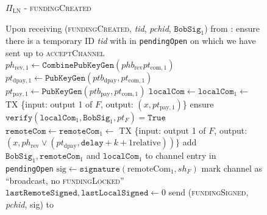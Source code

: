 \begin{figure}[!htbp]
  \begin{protocolbox}{$\Pi_{\mathrm{LN}}$ - \textsc{fundingCreated}}
    \begin{algorithmic}[1]
      \State Upon receiving (\textsc{fundingCreated}, \textit{tid},
      \textit{pchid}, $\mathtt{BobSig}_1$) from \bob:
      \Indent
        \State ensure there is a temporary ID \textit{tid} with \bob{} in
        \texttt{pendingOpen} on which we have sent up to \textsc{acceptChannel}
        \State $ph_{\mathrm{rev}, 1} \gets
        \mathtt{CombinePubKeyGen}\left(phb_{\mathrm{rev}} pt_{\mathrm{com},
        1}\right)$
        \State $pt_{\mathrm{dpay}, 1} \gets
        \texttt{PubKeyGen}\left(ptb_{\mathrm{dpay}}, pt_{\mathrm{com},
        1}\right)$
        \State $pt_{\mathrm{pay}, 1} \gets
        \texttt{PubKeyGen}\left(ptb_{\mathrm{pay}}, pt_{\mathrm{com}, 1}\right)$
        \State $\mathtt{localCom} \gets \mathtt{localCom}_1 \gets$ TX \{input:
        output 1 of $F$, output: $\left(x, pt_{\mathrm{pay}, 1}\right)$\}
        \State ensure $\mathtt{verify}\left(\mathtt{localCom}_1,
        \mathtt{BobSig}_1, pt_F\right) = \mathtt{True}$
        \State $\mathtt{remoteCom} \gets \mathtt{remoteCom}_1 \gets$ TX \{input:
        output 1 of $F$, output: $\left(x, ph_{\mathrm{rev}} \vee
        \left(pt_{\mathrm{dpay}}, \mathtt{delay} + k + 1 \text{
        relative}\right)\right)\}$
        \State add $\mathtt{BobSig}_1, \mathtt{remoteCom}_1$ and
        $\mathtt{localCom}_1$ to channel entry in \texttt{pendingOpen}
        \State $\mathrm{sig} \gets \mathtt{signature}\left(\mathrm{remoteCom}_1,
        sh_F\right)$
        \State mark channel as ``broadcast, no \textsc{fundingLocked}''
        \State $\mathtt{lastRemoteSigned}, \mathtt{lastLocalSigned} \gets 0$
        \State send (\textsc{fundingSigned}, \textit{pchid}, sig) to \bob{}
      \EndIndent
    \end{algorithmic}
  \end{protocolbox}
  \caption{}
  \label{alg:protocol:open:fundingCreated}
\end{figure}

